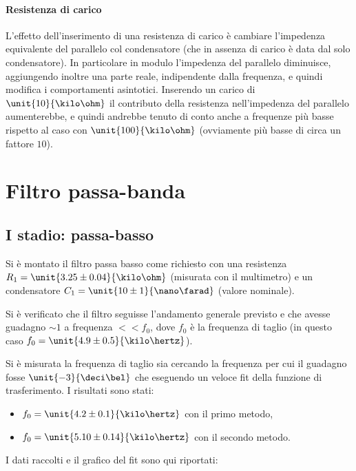 \documentclass[10pt,a4paper]{article}
\begin{document}
\paragraph{Resistenza di carico} L'effetto dell'inserimento di una resistenza di carico è cambiare l'impedenza equivalente del parallelo col condensatore (che in assenza di carico è data dal solo condensatore). In particolare in modulo l'impedenza del parallelo diminuisce, aggiungendo inoltre una parte reale, indipendente dalla frequenza, e quindi modifica i comportamenti asintotici.
Inserendo un carico di $\unit{10}{\kilo\ohm}$ il contributo della resistenza nell'impedenza del parallelo aumenterebbe, e quindi andrebbe tenuto di conto anche a frequenze più basse rispetto al caso con $\unit{100}{\kilo\ohm}$ (ovviamente più basse di circa un fattore $10$).

\section{Filtro passa-banda}

\subsection{I stadio: passa-basso}

Si è montato il filtro passa basso come richiesto con una resistenza $R_1 = \unit{3.25 \pm 0.04}{\kilo\ohm}$ (misurata con il multimetro) e un condensatore $C_1=\unit{10 \pm 1}{\nano\farad}$ (valore nominale).

Si è verificato che il filtro seguisse l'andamento generale previsto e che avesse guadagno $\sim 1$ a frequenza $<<f_0$, dove $f_0$ è la frequenza di taglio (in questo caso $f_0 = \unit{4.9 \pm 0.5}{\kilo\hertz}$).

Si è misurata la frequenza di taglio sia cercando la frequenza per cui il guadagno fosse $\unit{-3}{\deci\bel}$ che eseguendo un veloce fit della funzione di trasferimento.
I risultati sono stati:
\begin{itemize}
	\item $f_0 = \unit{4.2 \pm 0.1}{\kilo\hertz}$ con il primo metodo,
	\item $f_0 = \unit{5.10 \pm 0.14}{\kilo\hertz}$ con il secondo metodo.
\end{itemize}
I dati raccolti e il grafico del fit sono qui riportati:

\begin{figure}[h!]
	\centering
	
\end{figure}
\end{document}

